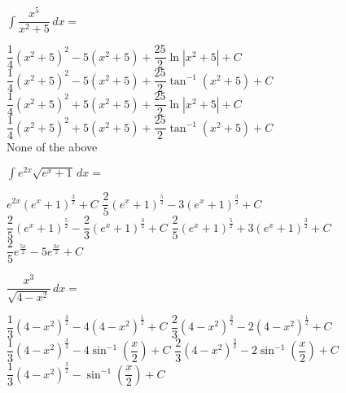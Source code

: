 \begin{questions}
    \question $\int \dfrac{x^5}{x^2 + 5} \, dx = $ \\

    \begin{oneparchoices}
        \choice $\dfrac{1}{4}\left(x^2 + 5\right)^2 - 5\left(x^2 + 5\right) + \dfrac{25}{2}\ln |x^2 + 5| + C$ \\[11pt]
        \makebox[0.035\textwidth] \choice $\dfrac{1}{4}\left(x^2 + 5\right)^2 - 5\left(x^2 + 5\right) + \dfrac{25}{2}\tan^{-1} \left(x^2 + 5\right) + C$ \\[11pt]
        \makebox[0.035\textwidth] \choice $\dfrac{1}{4}\left(x^2 + 5\right)^2 + 5\left(x^2 + 5\right) + \dfrac{25}{2}\ln |x^2 + 5| + C$ \\[11pt]
        \makebox[0.035\textwidth] \choice $\dfrac{1}{4}\left(x^2 + 5\right)^2 + 5\left(x^2 + 5\right) + \dfrac{25}{2}\tan^{-1} \left(x^2 + 5\right) + C$ \\[11pt]
        \makebox[0.035\textwidth] \choice None of the above
    \end{oneparchoices} \par \horizontalline

    \question $\int e^{2x}\sqrt{e^x + 1} \, dx = $ \\

    \begin{oneparchoices}
        \choice $e^{2x}\left(e^x + 1\right)^{\frac{3}{2}} + C$
        \choice $\dfrac{2}{5}\left(e^x + 1\right)^{\frac{5}{2}} - 3\left(e^x + 1\right)^{\frac{3}{2}} + C$ \\[11pt]
        \makebox[0.035\textwidth] \choice $\dfrac{2}{5}\left(e^x + 1\right)^{\frac{5}{2}} - \dfrac{2}{3}\left(e^x + 1\right)^{\frac{3}{2}} + C$ 
        \choice $\dfrac{2}{5}\left(e^x + 1\right)^{\frac{5}{2}} + 3\left(e^x + 1\right)^{\frac{3}{2}} + C$ \\[11pt]
        \makebox[0.035\textwidth] \choice $\dfrac{2}{5}e^{\frac{5x}{2}} - 5e^{\frac{3x}{2}} + C$
    \end{oneparchoices} \par \horizontalline

    \question $\dfrac{x^3}{\sqrt{4 - x^2}} \, dx = $ \\

    \begin{oneparchoices}
        \choice $\dfrac{1}{3}\left(4 - x^2\right)^{\frac{3}{2}} - 4\left(4 - x^2\right)^{\frac{1}{2}} + C$ 
        \choice $\dfrac{2}{3}\left(4 - x^2\right)^{\frac{3}{2}} - 2\left(4 - x^2\right)^{\frac{1}{2}} + C$ \\[11pt]
        \makebox[0.035\textwidth] \choice $\dfrac{1}{3}\left(4 - x^2\right)^{\frac{3}{2}} - 4\sin^{-1} \left(\dfrac{x}{2}\right) + C$
        \choice $\dfrac{2}{3}\left(4 - x^2\right)^{\frac{3}{2}} - 2\sin^{-1} \left(\dfrac{x}{2}\right) + C$ \\[11pt]
        \makebox[0.035\textwidth] \choice $\dfrac{1}{3}\left(4 - x^2\right)^{\frac{3}{2}} - \sin^{-1} \left(\dfrac{x}{2}\right) + C$
    \end{oneparchoices} \par \horizontalline


\end{questions}
